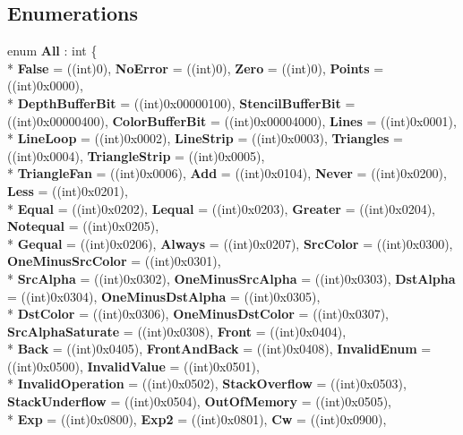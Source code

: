 \subsection*{Enumerations}
\begin{DoxyCompactItemize}
\item 
enum {\bfseries All} \-: int \{ \\*
{\bfseries False} = ((int)0), 
{\bfseries No\-Error} = ((int)0), 
{\bfseries Zero} = ((int)0), 
{\bfseries Points} = ((int)0x0000), 
\\*
{\bfseries Depth\-Buffer\-Bit} = ((int)0x00000100), 
{\bfseries Stencil\-Buffer\-Bit} = ((int)0x00000400), 
{\bfseries Color\-Buffer\-Bit} = ((int)0x00004000), 
{\bfseries Lines} = ((int)0x0001), 
\\*
{\bfseries Line\-Loop} = ((int)0x0002), 
{\bfseries Line\-Strip} = ((int)0x0003), 
{\bfseries Triangles} = ((int)0x0004), 
{\bfseries Triangle\-Strip} = ((int)0x0005), 
\\*
{\bfseries Triangle\-Fan} = ((int)0x0006), 
{\bfseries Add} = ((int)0x0104), 
{\bfseries Never} = ((int)0x0200), 
{\bfseries Less} = ((int)0x0201), 
\\*
{\bfseries Equal} = ((int)0x0202), 
{\bfseries Lequal} = ((int)0x0203), 
{\bfseries Greater} = ((int)0x0204), 
{\bfseries Notequal} = ((int)0x0205), 
\\*
{\bfseries Gequal} = ((int)0x0206), 
{\bfseries Always} = ((int)0x0207), 
{\bfseries Src\-Color} = ((int)0x0300), 
{\bfseries One\-Minus\-Src\-Color} = ((int)0x0301), 
\\*
{\bfseries Src\-Alpha} = ((int)0x0302), 
{\bfseries One\-Minus\-Src\-Alpha} = ((int)0x0303), 
{\bfseries Dst\-Alpha} = ((int)0x0304), 
{\bfseries One\-Minus\-Dst\-Alpha} = ((int)0x0305), 
\\*
{\bfseries Dst\-Color} = ((int)0x0306), 
{\bfseries One\-Minus\-Dst\-Color} = ((int)0x0307), 
{\bfseries Src\-Alpha\-Saturate} = ((int)0x0308), 
{\bfseries Front} = ((int)0x0404), 
\\*
{\bfseries Back} = ((int)0x0405), 
{\bfseries Front\-And\-Back} = ((int)0x0408), 
{\bfseries Invalid\-Enum} = ((int)0x0500), 
{\bfseries Invalid\-Value} = ((int)0x0501), 
\\*
{\bfseries Invalid\-Operation} = ((int)0x0502), 
{\bfseries Stack\-Overflow} = ((int)0x0503), 
{\bfseries Stack\-Underflow} = ((int)0x0504), 
{\bfseries Out\-Of\-Memory} = ((int)0x0505), 
\\*
{\bfseries Exp} = ((int)0x0800), 
{\bfseries Exp2} = ((int)0x0801), 
{\bfseries Cw} = ((int)0x0900), 

\end{DoxyCompactItemize}
